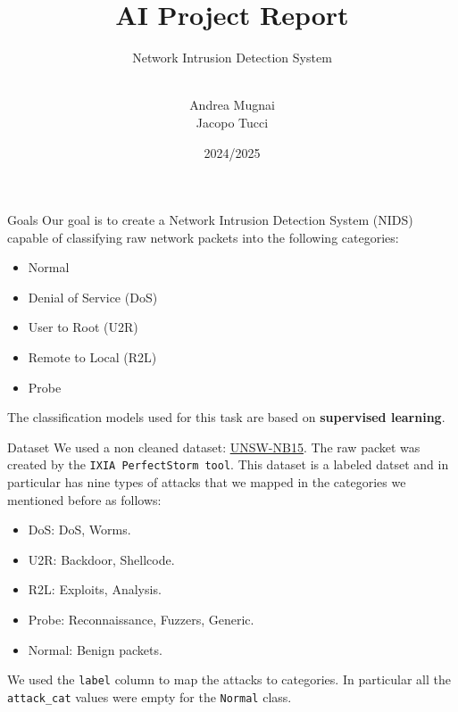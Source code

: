 \documentclass[12pt,aspectratio=169,notheorems]{beamer}
\title{\LARGE AI Project Report}
\subtitle{Network Intrusion Detection System}
\author{\\ Andrea Mugnai \\ Jacopo Tucci}
\date{2024/2025}
\begin{document}
\maketitle

\begin{frame}{Goals}
    Our goal is to create a Network Intrusion Detection System (NIDS) capable of classifying raw network packets into the following categories:
    \begin{itemize}
        \item Normal
        \item Denial of Service (DoS)
        \item User to Root (U2R)
        \item Remote to Local (R2L)
        \item Probe
    \end{itemize}
    The classification models used for this task are based on \textbf{supervised learning}.
\end{frame}

\begin{frame}{Dataset}
    We used a non cleaned dataset: \href{https://research.unsw.edu.au/projects/unsw-nb15-dataset}{UNSW-NB15}. 
    The raw packet was created by the \texttt{IXIA PerfectStorm tool}. This dataset is a labeled datset and in particular has nine types of attacks 
    that we mapped in the categories we mentioned before as follows:
    \begin{itemize}
        \item DoS: DoS, Worms.
        \item U2R: Backdoor, Shellcode.
        \item R2L: Exploits, Analysis.
        \item Probe: Reconnaissance, Fuzzers, Generic.
        \item Normal: Benign packets.
    \end{itemize}
        \small We used the \texttt{label} column to map the attacks to categories. In particular all the \texttt{attack\_cat} values were empty for the \texttt{Normal} class. \\
\end{frame}
\end{document}
